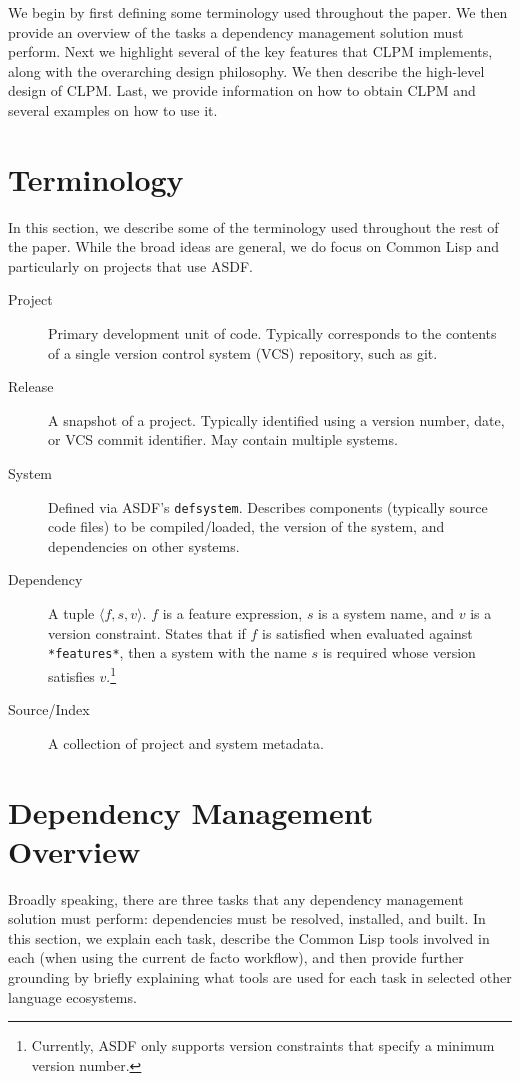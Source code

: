 \documentclass[format=sigconf]{acmart}
\begin{document}
We begin by first defining some terminology used throughout the paper. We then
provide an overview of the tasks a dependency management solution must
perform. Next we highlight several of the key features that CLPM implements,
along with the overarching design philosophy. We then describe the high-level
design of CLPM. Last, we provide information on how to obtain CLPM and several
examples on how to use it.

\section{Terminology}

In this section, we describe some of the terminology used throughout the rest
of the paper. While the broad ideas are general, we do focus on Common Lisp and
particularly on projects that use ASDF.

\begin{description}
\item[Project] Primary development unit of code. Typically corresponds to the
  contents of a single version control system (VCS) repository, such as
  git.
\item[Release] A snapshot of a project. Typically identified using a version
  number, date, or VCS commit identifier. May contain multiple systems.
\item[System] Defined via ASDF's \verb=defsystem=. Describes components
  (typically source code files) to be compiled/loaded, the version of the
  system, and dependencies on other systems.
\item[Dependency] A tuple $\langle f, s, v \rangle$. $f$ is a feature
  expression, $s$ is a system name, and $v$ is a version constraint. States
  that if $f$ is satisfied when evaluated against \verb=*features*=, then a
  system with the name $s$ is required whose version satisfies
  $v$.\footnote{Currently, ASDF only supports version constraints that specify
    a minimum version number.}
\item[Source/Index] A collection of project and system metadata.
\end{description}

\section{Dependency Management Overview}

Broadly speaking, there are three tasks that any dependency management solution
must perform: dependencies must be resolved, installed, and built. In this
section, we explain each task, describe the Common Lisp tools involved in each
(when using the current de facto workflow), and then provide further grounding
by briefly explaining what tools are used for each task in selected other
language ecosystems.
\end{document}

